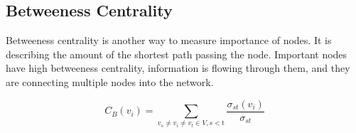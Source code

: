 \subsection{Betweeness Centrality}

Betweeness centrality is another way to measure importance of nodes.
It is describing the amount of the shortest path passing the node.
Important nodes have high betweeness centrality, information is flowing through them, and they are connecting multiple nodes into the network.

\begin{equation*}
    C_{B}(v_{i})={\sum}_{v_{s}\neq v_{i}\neq v_{t}\in V,s < \text{t}}\frac{\sigma_{st}(v_{i})}{\sigma_{st}} \tag{3}
\end{equation*}

